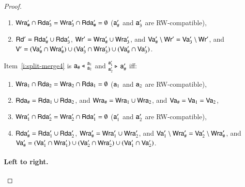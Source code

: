 \documentclass{llncs}
\newcommand{\mrg}[3]{ ^{#2}_{#3} \triangleright \, #1 }
\newcommand{\splt}[3]{ #1 \triangleleft \, ^{#2}_{#3} }
\newcommand{\readset}{\mathsf{Rd}}
\newcommand{\valuset}{\mathsf{V}}
\newcommand{\writeset}{\mathsf{Wr}}
\begin{document}
\begin{proof}
\begin{enumerate}[resume]
    
    \item $\mathsf {Wra}'_\# \cap \mathsf {Rda}'_3 = \mathsf {Wra}'_3 \cap \mathsf {Rda}'_\# = \emptyset$ ($\mathsf a'_\#$ and $\mathsf a'_3$ are RW-compatible),
    \item $\readset' = \readseta'_\# \cup \readseta'_3$, $\writeset' = \writeseta'_\# \cup \writeseta'_3$, and $\valuseta'_\# \setminus \writeset' = \valuseta'_3 \setminus \writeset'$, and $\valuset' = (\valuseta'_\# \cap \writeseta'_\#) \cup (\valuseta'_3 \cap \writeseta'_3) \cup (\valuseta'_\# \cap \valuseta'_3) $. 
\end{enumerate}
Item~\ref{i:split-merge4} is $\splt{\modla_\#}{\modla_1} {\modla_2}$ and $\mrg{\modla'_\#}{\modla'_1} {\modla'_2}$ iff:
\begin{enumerate}[resume]
\item
  $\mathsf {Wra}_1 \cap \mathsf {Rda}_2 = \mathsf {Wra}_2 \cap \mathsf {Rda}_1 = \emptyset$ ($\mathsf a_1$ and $\mathsf a_2$ are RW-compatible),
  \item 
    $\mathsf {Rda}_\# = \mathsf {Rda}_1 \cup \mathsf {Rda}_2 $, and $\mathsf {Wra}_\# = \mathsf {Wra}_1 \cup \mathsf {Wra}_2$, and $\mathsf {Va}_\# = \mathsf {Va}_1 = \mathsf {Va}_2$,

    
    \item $\mathsf {Wra}'_1 \cap \mathsf {Rda}'_2 = \mathsf {Wra}'_2 \cap \mathsf {Rda}'_1 = \emptyset$ ($\mathsf a'_1$ and $\mathsf a'_2$ are RW-compatible),
    \item\label{i:rhslast} $\mathsf {Rda}_\#' = \mathsf {Rda}'_1 \cup \mathsf {Rda}'_2$, $\mathsf {Wra}_\#' = \mathsf {Wra}'_1 \cup \mathsf {Wra}'_2$, and $\mathsf {Va}'_1 \setminus \mathsf {Wra}_\#' = \mathsf {Va}'_2 \setminus \mathsf {Wra}_\#'$, and $\mathsf {Va}_\#' = (\mathsf {Va}'_1 \cap \mathsf {Wra}'_1) \cup (\mathsf {Va}'_2 \cap \mathsf {Wra}'_2) \cup (\mathsf {Va}'_1 \cap \mathsf {Va}'_2) $. 
\end{enumerate}


\paragraph{Left to right.}


\end{proof}
\end{document}
